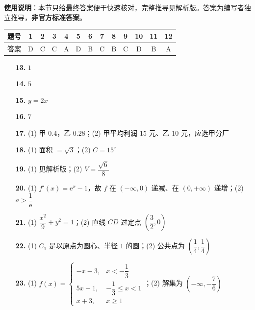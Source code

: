 
\begin{gknotice}
\textbf{使用说明}：本节只给最终答案便于快速核对，完整推导见解析版。答案为编写者独立推导，\textbf{非官方标准答案}。
\end{gknotice}

\begin{center}\begin{tabular}{ccccccccccccc}
\toprule
题号 & 1 & 2 & 3 & 4 & 5 & 6 & 7 & 8 & 9 & 10 & 11 & 12 \\
\midrule
答案 & D & C & C & A & D & B & C & B & C & D & B & A \\
\bottomrule
\end{tabular}\end{center}

\begin{itemize}[leftmargin=2.6em]
  \item[\textbf{13.}] $1$
  \item[\textbf{14.}] $5$
  \item[\textbf{15.}] $y=2x$
  \item[\textbf{16.}] $7$
\end{itemize}

\begin{itemize}[leftmargin=2.6em]
  \item[\textbf{17.}] (1) 甲 $0.4$，乙 $0.28$；(2) 甲平均利润 $15$ 元、乙 $10$ 元，应选甲分厂
  \item[\textbf{18.}] (1) 面积 $=\sqrt3$；(2) $C=15^\circ$
  \item[\textbf{19.}] (1) 见解析版；(2) $V=\dfrac{\sqrt6}8$
  \item[\textbf{20.}] (1) $f'(x)=\mathrm e^{x}-1$，故 $f$ 在 $(-\infty,0)$ 递减、在 $(0,+\infty)$ 递增；(2) $a>\dfrac1{\mathrm e}$
  \item[\textbf{21.}] (1) $\dfrac{x^{2}}9+y^{2}=1$；(2) 直线 $CD$ 过定点 $\left(\dfrac32,0\right)$
\end{itemize}

\begin{itemize}[leftmargin=2.6em]
  \item[\textbf{22.}] (1) $C_1$ 是以原点为圆心、半径 $1$ 的圆；(2) 公共点为 $\left(\dfrac14,\dfrac14\right)$
  \item[\textbf{23.}] (1) $f(x)=\begin{cases}-x-3,&x<-\dfrac13\\ 5x-1,&-\dfrac13\le x<1\\ x+3,&x\ge1\end{cases}$；(2) 解集为 $\left(-\infty,-\dfrac76\right)$
\end{itemize}
